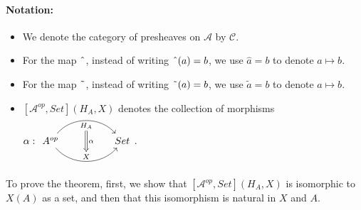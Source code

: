 \documentclass[a4paper]{article}
\theoremstyle{definition}
\begin{document}
		\paragraph{Notation:} \begin{itemize}
			\item We denote the category of presheaves on $\mathcal{A}$ by $\mathcal{C}$.
			\item For the map $\string ^$, instead of writing $\string ^ (a)=b$,
				we use $\hat{a} = b$ to denote $a \mapsto b$.

			\item For the map $\string ~$, instead of writing $\string ~ (a)=b$,
				we use $\tilde{a} = b$ to denote $a \mapsto b$.
			\item $[ \mathcal{A}^{op},Set](	H_A,X) $ denotes the collection of morphisms $\alpha: \begin{tikzcd}[row sep=large, column sep=huge]
					A^{op} \arrow[r,bend left=50, "H_A"{name=U, below}]
					\arrow[r, bend right = 50, "X"{name=D, above}]
					& Set
					\arrow[Rightarrow, from=U , to=D, "\alpha"]
				\end{tikzcd}$.
		\end{itemize}
		To prove the theorem,
		first, we show that $[ \mathcal{A} ^{op}, Set](H_A,X)$ is isomorphic to $X(A) $ as a set,
		and then that this isomorphism is natural in $X$ and $A$.
\end{document}
